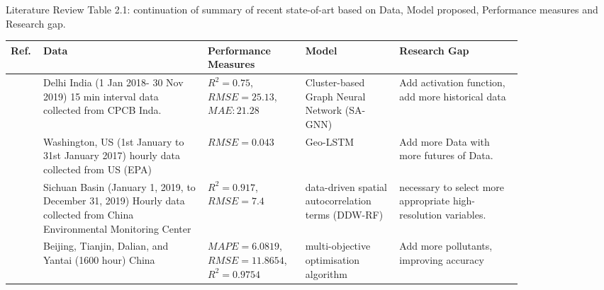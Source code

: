 \documentclass[12pt, aspectratio=169]{beamer}
\begin{document}
\begin{frame}{Literature Review}
	\centering
	\scriptsize {Table 2.1: continuation of summary of recent state-of-art based on Data,  Model proposed,  Performance measures and Research gap.}\\
	\begin{table}
		\centering
		\begin{tabular}{|p{0.03\linewidth}|p{0.29\linewidth}|p{0.15\linewidth}|p{0.16\linewidth}|p{0.21\linewidth}|}
			\hline
			\footnotesize \textbf {Ref.} & \footnotesize \textbf { Data} & \footnotesize \textbf {Performance Measures } & \footnotesize \textbf {Model} & \footnotesize \textbf {Research Gap }  \\ \hline
			\scriptsize \cite{MANDAL2023137036} \scriptsize & Delhi India (1 Jan 2018- 30 Nov 2019) 15 min interval data collected from CPCB Inda. \scriptsize &$R^2=0.75$,  $RMSE=25.13$,  $MAE: 21.28$ \scriptsize & Cluster-based Graph Neural Network (SA-GNN) \scriptsize & Add activation function, add more historical data \\ \hline
			\scriptsize \cite{MA2019117729} \scriptsize & Washington, US (1st January to 31st January 2017) hourly data collected from US (EPA) \scriptsize & $RMSE = 0.043$ \scriptsize & Geo-LSTM \scriptsize & Add more Data with more futures of Data.  \\ \hline
			\scriptsize \cite{ZHANG2022134890}\scriptsize & Sichuan Basin (January 1,  2019,  to December 31,  2019) Hourly data collected from  China Environmental Monitoring Center  \scriptsize & $R^2= 0.917$, $RMSE=7.4$ \scriptsize & data-driven spatial autocorrelation terms (DDW-RF) \scriptsize & necessary to select more appropriate high-resolution variables. \\ \hline
			\scriptsize \cite{TIAN2022134048} \scriptsize & Beijing,  Tianjin,  Dalian,  and Yantai (1600 hour) China \scriptsize & $MAPE=6.0819$, $RMSE=11.8654$, $R^2=0.9754$ \scriptsize &  multi-objective optimisation algorithm \scriptsize & Add more pollutants, improving accuracy \\ \hline
	\end{tabular}
	\end{table}
\end{frame}
\end{document}
